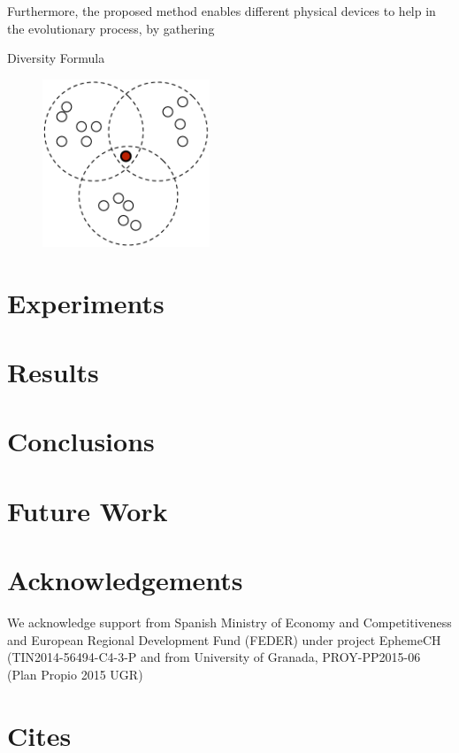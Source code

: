 \documentclass[runningheads,a4paper]{llncs}
\begin{document}
Furthermore, the proposed method enables different physical
devices to help in the evolutionary process, by gathering

Diversity Formula

\begin{figure}
  \centering
  \includegraphics[width=5cm]{pdf/distributed-pso}
  \caption{}
  \label{distributed-pso}
\end{figure}

\section{Experiments}
\label{experiments}

\section{Results}
\label{results}

\section{Conclusions}
\label{conclusions}

\section{Future Work}
\label{future-work}

\section{Acknowledgements}

We acknowledge support from 
Spanish Ministry of Economy and Competitiveness and European Regional
Development Fund (FEDER) under project EphemeCH
(TIN2014-56494-C4-3-P and  
from University of Granada, PROY-PP2015-06 (Plan Propio 2015 UGR)
\section{Cites}


\cite{garcia2015evospace}
\cite{garcia2014randomized}
\cite{merelo2012pool}
\cite{mussi2011gpu}
\cite{merelo2013designing}
\cite{merelo2008asynchronous}
\cite{morrison2001measurement}
\cite{roy2009distributed}
\cite{sherry2012flex}
\cite{tanabe2013evaluation}
\cite{de1990analysis}
\cite{melin2013optimal}
\cite{zadeh1988fuzzy}
\cite{zadeh1965fuzzy}
\cite{abdelbar2005fuzzy}
\cite{kenndy1995particle}
\cite{mcnabb2007parallel}
\cite{venter2006parallel}
\cite{koh2006parallel}
\cite{cheng2013population}
\cite{gong2011distributed}



\end{document}
